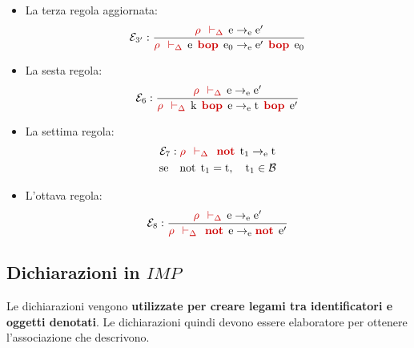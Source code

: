 \documentclass[a4paper]{article}
\begin{document}
\begin{itemize}
		\item La terza regola aggiornata:
		\begin{equation*}
			\mathcal{E}_{3'} : \dfrac{
				\textcolor{Red3}{\rho \:\: \vdash_{\Delta}} \:\: \mathrm{e} \rightarrow_{\mathrm{e}} \mathrm{e}'
			}{
				\textcolor{Red3}{\rho \:\: \vdash_{\Delta}} \:\: \mathrm{e} \:\: \textcolor{Red3}{\mathbf{bop}} \:\: \mathrm{e}_{0} \rightarrow_{\mathrm{e}} \mathrm{e}' \:\: \textcolor{Red3}{\mathbf{bop}} \:\: \mathrm{e}_{0}
			}
		\end{equation*}\newpage
		
		\item La sesta regola:
		\begin{equation*}
			\mathcal{E}_{6} : \dfrac{
				\textcolor{Red3}{\rho \:\: \vdash_{\Delta}} \:\: \mathrm{e} \rightarrow_{\mathrm{e}} \mathrm{e}'
			}{
				\textcolor{Red3}{\rho \:\: \vdash_{\Delta}} \:\: \mathrm{k} \:\: \textcolor{Red3}{\mathbf{bop}} \:\: \mathrm{e} \rightarrow_{\mathrm{e}} \mathrm{t} \:\: \textcolor{Red3}{\mathbf{bop}} \:\: \mathrm{e}'
			}
		\end{equation*}
		
		\item La settima regola:
		\begin{gather*}
			\mathcal{E}_{7}: \textcolor{Red3}{\rho \:\: \vdash_{\Delta} \:\: \mathbf{not}} \:\: \mathrm{t}_{1} \rightarrow_{\mathrm{e}} \mathrm{t} \\
			\mathrm{se} \hspace{1em} \mathrm{not} \:\: \mathrm{t}_{1} = \mathrm{t}, \hspace{1em} \mathrm{t}_{1} \in \mathcal{B}
		\end{gather*}
		
		\item L'ottava regola:
		\begin{equation*}
			\mathcal{E}_{8}: \dfrac{
				\textcolor{Red3}{\rho \:\: \vdash_{\Delta}} \:\: \mathrm{e} \rightarrow_{\mathrm{e}} \mathrm{e}'
			}{
				\textcolor{Red3}{\rho \:\: \vdash_{\Delta} \:\: \mathbf{not}} \:\: \mathrm{e} \rightarrow_{\mathrm{e}} \textcolor{Red3}{\mathbf{not}} \:\: \mathrm{e}'
			}
		\end{equation*}
	\end{itemize}\newpage
	
	\subsection{Dichiarazioni in $IMP$}
	
	Le dichiarazioni vengono \textbf{utilizzate per creare legami tra identificatori e oggetti denotati}. Le dichiarazioni quindi devono essere elaboratore per ottenere l'associazione che descrivono.\newline
	
\end{document}
